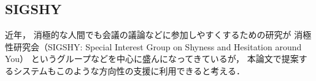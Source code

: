 \subsection{SIGSHY}

近年，
消極的な人間でも会議の議論などに参加しやすくするための研究が
消極性研究会（SIGSHY: Special Interest Group on Shyness and Hesitation around You）
というグループなどを中心に盛んになってきているが\cite{kurihara2016}\cite{nishida2011}，
本論文で提案するシステムもこのような方向性の支援に利用できると考える．